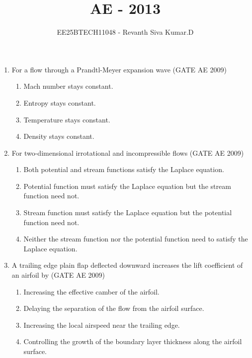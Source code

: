 \documentclass[journal,12pt,onecolumn]{IEEEtran}
\title{\LARGE \textbf{AE - 2013}}
\author{\Large EE25BTECH11048 - Revanth Siva Kumar.D}
\date{}
\theoremstyle{remark}
\begin{document}
\maketitle
\begin{flushleft}
\begin{enumerate}


\item 
For a flow through a Prandtl-Meyer expansion wave 
\hfill(GATE AE 2009)
\begin{multicols}{2}
\begin{enumerate}
\item Mach number stays constant.
\item Entropy stays constant.
\item Temperature stays constant.
\item Density stays constant.
\end{enumerate}
\end{multicols}

\item 
For two-dimensional irrotational and incompressible flows
\hfill(GATE AE 2009)
\begin{multicols}{2}
\begin{enumerate}
\item Both potential and stream functions satisfy the Laplace equation.
\item Potential function must satisfy the Laplace equation but the stream function need not.
\item Stream function must satisfy the Laplace equation but the potential function need not.
\item Neither the stream function nor the potential function need to satisfy the Laplace equation.
\end{enumerate}
\end{multicols}

\item 
A trailing edge plain flap deflected downward increases the lift coefficient of an airfoil by
\hfill(GATE AE 2009)
\begin{enumerate}
\item Increasing the effective camber of the airfoil.
\item Delaying the separation of the flow from the airfoil surface.
\item Increasing the local airspeed near the trailing edge.
\item Controlling the growth of the boundary layer thickness along the airfoil surface.
\end{enumerate}


\end{enumerate}
\end{flushleft}
\end{document}
